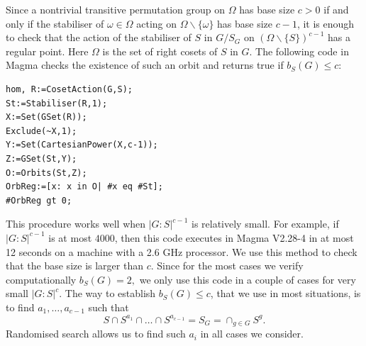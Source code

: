 \documentclass[a4paper,reqno,11pt]{amsart}
\theoremstyle{definition}
\theoremstyle{remark}
\numberwithin{equation}{section}
\newcommand{\GL}{{\mathrm{GL}}}
\begin{document}
Since a nontrivial transitive permutation group on $\Omega$ has base size $c>0$ if and only if the stabiliser of  $\omega \in \Omega$ acting on $\Omega \backslash \{\omega\}$ has base size $c-1$, it is enough to check that the action of the stabiliser of $S$ in $G/S_G$ on $(\Omega \backslash \{S\})^{c-1}$ has a regular point. Here $\Omega$ is the set of right cosets of $S$ in $G$. The following code in {\sc Magma} checks the existence of such an orbit  and returns {\sf true} if $b_S(G) \le c$: 
\lstset{
basicstyle=\ttfamily}  
{\small
\begin{lstlisting}
hom, R:=CosetAction(G,S);
St:=Stabiliser(R,1);
X:=Set(GSet(R));
Exclude(~X,1);
Y:=Set(CartesianPower(X,c-1));
Z:=GSet(St,Y);
O:=Orbits(St,Z);
OrbReg:=[x: x in O| #x eq #St];
#OrbReg gt 0;
\end{lstlisting}}

 This procedure works well when $|G:S|^{c-1}$ is relatively small. For example, if $|G:S|^{c-1}$ is at most $4000$, then this code executes in {\sc Magma} V2.28-4 in at most 12 seconds on a machine with a 2.6 GHz processor. We use this method to check that the base size is larger than $c$. Since for the most cases we verify computationally $b_S(G)=2,$ we only use this code in a couple of cases for very small $|G:S|^c$.
    The way to establish  $b_S(G)\le c$, that we use in most situations, is to find $a_1, \ldots, a_{c-1}$ such that 
\begin{equation}
\label{gapint}
S \cap S^{a_1} \cap \ldots \cap S^{a_{c-1}} =S_G=\cap_{g \in G} S^g.
\end{equation}
Randomised search allows us to find such $a_i$ in all cases we consider. 
\end{document}
